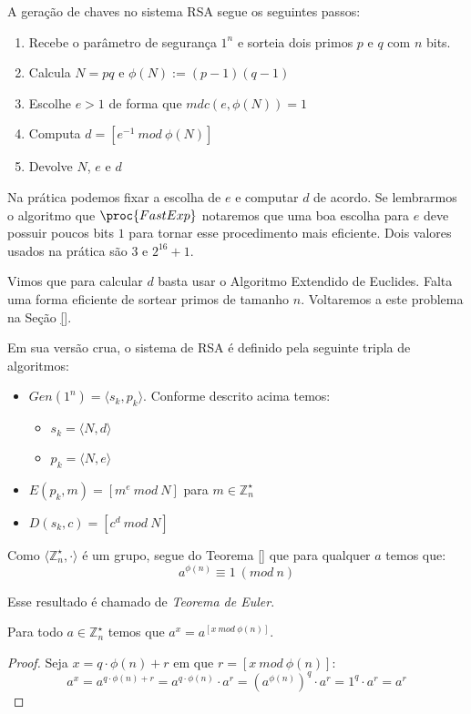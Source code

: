 A geração de chaves no sistema RSA segue os seguintes passos:
\begin{enumerate}
\item Recebe o parâmetro de segurança $1^n$ e sorteia dois primos $p$ e $q$ com $n$ bits.
\item Calcula $N = pq$ e $\phi(N) := (p - 1)(q - 1)$
\item Escolhe $e > 1$ de forma que $mdc(e, \phi(N)) = 1$
\item Computa $d = [e^{-1}\ mod\ \phi(N)]$
\item Devolve $N$, $e$ e $d$ 
\end{enumerate}

Na prática podemos fixar a escolha de $e$ e computar $d$ de acordo.
Se lembrarmos o algoritmo que $\proc{FastExp}$ notaremos que uma boa escolha para $e$ deve possuir poucos bits $1$ para tornar esse procedimento mais eficiente.
Dois valores usados na prática são $3$ e $2^{16}+1$.

Vimos que para calcular $d$ basta usar o Algoritmo Extendido de Euclides.
Falta uma forma eficiente de sortear primos de tamanho $n$.
Voltaremos a este problema na Seção \ref{}.

Em sua versão crua, o sistema de RSA é definido pela seguinte tripla de algoritmos:

\begin{itemize}
\item $Gen(1^n) = \langle s_k, p_k \rangle$. Conforme descrito acima temos:
\begin{itemize}
\item  $s_k = \langle N, d \rangle$
\item  $p_k = \langle N, e \rangle$ 
\end{itemize}
\item $E(p_k, m) = [m^e\ mod\ N]$ para $m \in \mathbb{Z}_n^\star$
\item $D(s_k, c) = [c^d\ mod\ N]$
\end{itemize}

Como $\langle \mathbb{Z}_n^\star, \cdot \rangle$ é um grupo, segue do Teorema \ref{} que para qualquer $a$ temos que:
\begin{displaymath}
  a^{\phi(n)} \equiv 1\ (mod\ n)
\end{displaymath}

Esse resultado é chamado de {\em Teorema de Euler}.

\begin{corollary}
  Para todo $a \in \mathbb{Z}_n^\star$ temos que $a^x = a^{[x\ mod\ \phi(n)]}$.
\end{corollary}
\begin{proof}
  Seja $x = q \cdot \phi(n) + r$ em que $r = [x\ mod\ \phi(n)]$:
  \begin{displaymath}
    a^x = a^{q \cdot \phi(n) + r} = a^{q \cdot \phi(n)} \cdot a^r = (a^{\phi(n)})^q \cdot a^r = 1^q \cdot a^r = a^r
  \end{displaymath}
\end{proof}


